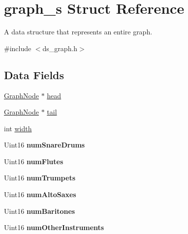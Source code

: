 \hypertarget{structgraph__s}{}\section{graph\+\_\+s Struct Reference}
\label{structgraph__s}


A data structure that represents an entire graph.  




{\ttfamily \#include $<$ds\+\_\+graph.\+h$>$}

\subsection*{Data Fields}
\begin{DoxyCompactItemize}
\item 
\hyperlink{structgraphnode__s}{Graph\+Node} $\ast$ \hyperlink{structgraph__s_a14d4df7f6c1f9d2c91c64b716680b8c8}{head}
\item 
\hyperlink{structgraphnode__s}{Graph\+Node} $\ast$ \hyperlink{structgraph__s_ac3263bb2bbf0b4404d76fbbba2c036c9}{tail}
\item 
int \hyperlink{structgraph__s_a2474a5474cbff19523a51eb1de01cda4}{width}
\item 
\mbox{\label{structgraph__s_a5ed7381790782351b9a8e4283b1d2abd}} 
Uint16 {\bfseries num\+Snare\+Drums}
\item 
\mbox{\label{structgraph__s_ac587abf040d7f36a88e9e4a9f782e920}} 
Uint16 {\bfseries num\+Flutes}
\item 
\mbox{\label{structgraph__s_a97a3d2a9434f13d7f1bfe83f40aa3252}} 
Uint16 {\bfseries num\+Trumpets}
\item 
\mbox{\label{structgraph__s_a3dfd862f54e2c1060394efb8162fe91f}} 
Uint16 {\bfseries num\+Alto\+Saxes}
\item 
\mbox{\label{structgraph__s_a23e654bd85fc7df1caba0a10a6e70bed}} 
Uint16 {\bfseries num\+Baritones}
\item 
\mbox{\label{structgraph__s_aa0c8e54b3c22839b437ddf389421f0b8}} 
Uint16 {\bfseries num\+Other\+Instruments}
\end{DoxyCompactItemize}


